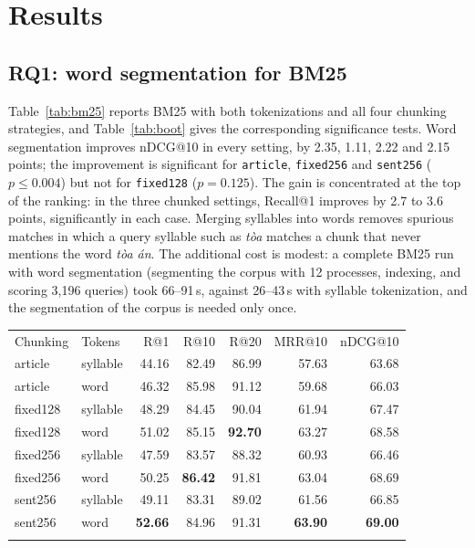 \documentclass{ws-vjcs}
\begin{document}
\section{Results}

\subsection{RQ1: word segmentation for BM25}

Table~\ref{tab:bm25} reports BM25 with both tokenizations and all four chunking strategies, and Table~\ref{tab:boot} gives the corresponding significance tests. Word segmentation improves nDCG@10 in every setting, by 2.35, 1.11, 2.22 and 2.15 points; the improvement is significant for \texttt{article}, \texttt{fixed256} and \texttt{sent256} ($p \le 0.004$) but not for \texttt{fixed128} ($p = 0.125$). The gain is concentrated at the top of the ranking: in the three chunked settings, Recall@1 improves by 2.7 to 3.6 points, significantly in each case. Merging syllables into words removes spurious matches in which a query syllable such as \emph{t\`oa} matches a chunk that never mentions the word \emph{t\`oa \'an}. The additional cost is modest: a complete BM25 run with word segmentation (segmenting the corpus with 12 processes, indexing, and scoring 3,196 queries) took 66--91\,s, against 26--43\,s with syllable tokenization, and the segmentation of the corpus is needed only once.

\begin{table}[t]
{\begin{tabular}{@{}llrrrrr@{}} \toprule
Chunking & Tokens & R@1 & R@10 & R@20 & MRR@10 & nDCG@10 \\ \colrule
article & syllable & 44.16 & 82.49 & 86.99 & 57.63 & 63.68 \\
article & word & 46.32 & 85.98 & 91.12 & 59.68 & 66.03 \\
fixed128 & syllable & 48.29 & 84.45 & 90.04 & 61.94 & 67.47 \\
fixed128 & word & 51.02 & 85.15 & \textbf{92.70} & 63.27 & 68.58 \\
fixed256 & syllable & 47.59 & 83.57 & 88.32 & 60.93 & 66.46 \\
fixed256 & word & 50.25 & \textbf{86.42} & 91.81 & 63.04 & 68.69 \\
sent256 & syllable & 49.11 & 83.31 & 89.02 & 61.56 & 66.85 \\
sent256 & word & \textbf{52.66} & 84.96 & 91.31 & \textbf{63.90} & \textbf{69.00} \\ \botrule
\end{tabular}}
\end{table}
\end{document}
